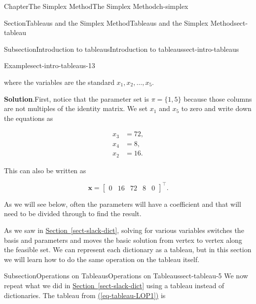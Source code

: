 \documentclass[oneside,10pt,]{book}
\newcommand{\blocktitlefont}{\relax}
\newcommand{\xreffont}{\relax}
\numberwithin{equation}{section}
\newcommand{\amp}{&}
\begin{document}
\begin{chapterptx}{Chapter}{The Simplex Method}{}{The Simplex Method}{}{}{ch-simplex}
\begin{sectionptx}{Section}{Tableaus and the Simplex Method}{}{Tableaus and the Simplex Method}{}{}{sect-tableau}
\begin{subsectionptx}{Subsection}{Introduction to tableaus}{}{Introduction to tableaus}{}{}{sect-intro-tableaus}
\begin{example}{Example}{}{sect-intro-tableaus-13}
\begin{equation*}
\end{equation*}
%
\par
where the variables are the standard \(x_1, x_2, \ldots, x_5\).%
\par\smallskip%
\noindent\textbf{\blocktitlefont Solution}.\hypertarget{sect-intro-tableaus-13-2}{}\quad{}First, notice that the parameter set is \(\pi = \{1,5\}\) because those columns are not multiples of the identity matrix. We set \(x_1\) and \(x_5\) to zero and write down the equations as%
\par
%
\begin{align*}
x_3 \amp =72,\\
x_4 \amp =8,\\
x_2 \amp = 16.
\end{align*}
%
\par
This can also be written as%
\par
%
\begin{equation*}
\boldsymbol{x} = \left[\begin{array}{rr|rrr} 0 \amp 16  \amp 72 \amp 8 \amp 0 \end{array}\right]^{\intercal}.
\end{equation*}
%
\par
As we will see below, often the parameters will have a coefficient and that will need to be divided through to find the result.%
\end{example}
As we saw in \hyperref[sect-slack-dict]{Section~{\xreffont\ref{sect-slack-dict}}}, solving for various variables switches the basis and parameters and moves the basic solution from vertex to vertex along the feasible set. We can represent each dictionary as a tableau, but in this section we will learn how to do the same operation on the tableau itself.%
\end{subsectionptx}
%
%
\typeout{************************************************}
\typeout{************************************************}
%
\begin{subsectionptx}{Subsection}{Operations on Tableaus}{}{Operations on Tableaus}{}{}{sect-tableau-5}
We now repeat what we did in \hyperref[sect-slack-dict]{Section~{\xreffont\ref{sect-slack-dict}}} using a tableau instead of dictionaries. The tableau from \hyperref[eq-tableau-LOP1]{({\xreffont\ref{eq-tableau-LOP1}})} is%
\par
%
\begin{equation}

\end{equation}
\end{subsectionptx}
\end{sectionptx}
\end{chapterptx}
\end{document}
